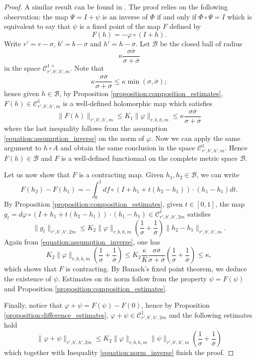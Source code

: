 \documentclass[10pt]{article}
\begin{document}
\begin{proof}
 A similar result can be found in \cite{MartinRamirezTamarit}. The proof relies on the following observation: the map $\Psi=I+\psi$ is an inverse of $\Phi$ if and only if $\Phi\circ \Psi=I$ which is equivalent to say that $\psi$ is a fixed point of the map $F$ defined by
 $$F(h) = -\varphi\circ(I+h).$$
 Write $r'=r-\sigma$, $b'=b-\overline\sigma$ and $h'=h-\overline\sigma$.  Let $\mathcal B$ be the closed ball of radius 
 \[
\kappa\frac{\sigma\overline\sigma}{\sigma+\overline\sigma}
 \]
 in the space $\mathscr C^{1+}_{r',b',h',m}$. Note that 
  \[
\kappa\frac{\sigma\overline\sigma}{\sigma+\overline\sigma}
\leq \kappa\min(\sigma,\overline{\sigma}) ;
 \]
 hence
 given $h\in\mathcal B$, by Proposition \ref{proposition:composition_estimates}, $F(h)\in \mathscr C^{1}_{r',b',h',m}$ is a well-defined holomorphic map which satisfies
 \begin{equation}
 \label{eq:bound_operator_inverse}
 \|F(h)\|_{r',b',h',m}\leq K_1\|\varphi\|_{r,b,h,m}\leq \kappa\frac{\sigma\overline\sigma}{\sigma+\overline\sigma}
 \end{equation}
 where the last inequality follows from the assumption \eqref{equation:assumption_inverse} on the norm of $\varphi$.
 Now we can apply the same argument to $h\circ A$ and obtain the same conclusion in the space $\mathscr C^{1}_{r',b',h',m}$.
 Hence $F(h)\in\mathcal B$ and $F$ is a well-defined functionnal on the complete metric space $\mathcal B$.
 
 Let us now show that $F$ is a contracting map. Given $h_1,h_2\in\mathcal B$, we can write 
 $$F(h_2)-F(h_1) = -\int_0^1 df\circ (I+h_1+t(h_2-h_1))\cdot(h_1-h_1)dt.$$
 By Proposition \ref{proposition:composition_estimates}, given $t\in [0,1]$, the map 
 $g_t = d\varphi\circ (I+h_1+t(h_2-h_1))\cdot(h_1-h_1)\in \mathscr C^1_{r',b',h',2m}$
 satisfies
 \[
 \|g_t\|_{r',b',h',2m} 
 \leq 
 K_2\|\varphi\|_{r,b,h,m}
 \left(\frac{1}{\sigma}+\frac{1}{\overline\sigma}\right)
 \|h_2-h_1\|_{r',b',h',m}.
 \]
 Again from \eqref{equation:assumption_inverse}, one has
 \[
 K_2\|\varphi\|_{r,b,h,m}
 \left(\frac{1}{\sigma}+\frac{1}{\overline\sigma}\right)
 \leq K_2\frac{\kappa}{K}\frac{\sigma\overline\sigma}{\sigma+\overline\sigma}\left(\frac{1}{\sigma}+\frac{1}{\overline\sigma}\right)
 \leq \kappa,
 \]
 which shows that $F$ is contracting.
 By Banach's fixed point theorem, we deduce the existence of $\psi$. Estimates on its norm follow from the property $\psi=F(\psi)$ and Proposition \ref{proposition:composition_estimates}.
 
 Finally, notice that $\varphi+\psi=F(\psi)-F(0)$, hence by Proposition \ref{proposition:difference_estimates}, $\varphi+\psi\in\mathscr C^1_{r',b',h',2m}$ and the following estimates hold
 \[
 \|\varphi+\psi\|_{r',b',h',2m} \leq K_2\|\varphi\|_{r,b,h,m}\|\psi\|_{r',b',h',m}
 \left(\frac{1}{\sigma}+\frac{1}{\overline\sigma}\right)
 \]
 which together with Inequality \eqref{equation:norm_inverse} finish the proof.
\end{proof}
\end{document}
